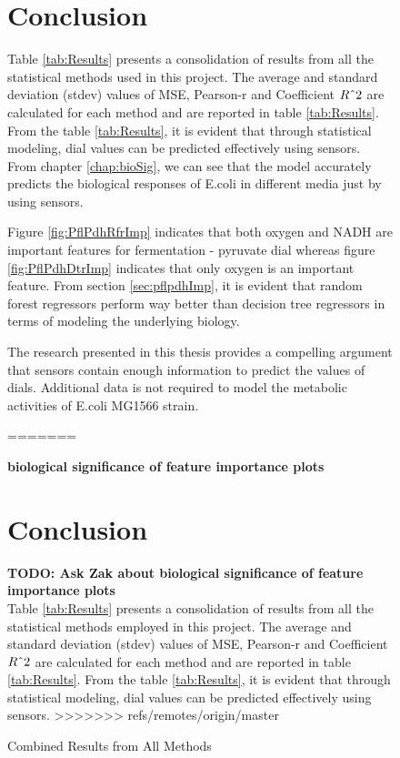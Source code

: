\documentclass[12pt,chapterheads]{ucsd}
\begin{document}
\begin{figure}[h!]
\chapter{Conclusion}
Table \ref{tab:Results} presents a consolidation of results from all the statistical methods used in this project. The average and standard deviation (stdev) values of MSE, Pearson-r and Coefficient $R\string^2$ are calculated for each method and are reported in table \ref{tab:Results}. From the table \ref{tab:Results}, it is evident that through statistical modeling, dial values can be predicted effectively using sensors. From chapter \ref{chap:bioSig}, we can see that the model accurately predicts the biological responses of E.coli in different media just by using sensors. 

Figure \ref{fig:PflPdhRfrImp} indicates that both oxygen and NADH are important features for fermentation - pyruvate dial whereas figure \ref{fig:PflPdhDtrImp} indicates that only oxygen is an important feature. From section \ref{sec:pflpdhImp}, it is evident that random forest regressors perform way better than decision tree regressors in terms of modeling the underlying biology. 

The research presented in this thesis provides a compelling argument that sensors contain enough information to predict the values of dials. Additional data is not required to model the metabolic activities of E.coli MG1566 strain.

=======

\textbf{biological significance of feature importance plots}
\chapter{Conclusion}
\textbf{TODO: Ask Zak about biological significance of feature importance plots}\\
Table \ref{tab:Results} presents a consolidation of results from all the statistical methods employed in this project. The average and standard deviation (stdev) values of MSE, Pearson-r and Coefficient $R\string^2$ are calculated for each method and are reported in table \ref{tab:Results}. From the table \ref{tab:Results}, it is evident that through statistical modeling, dial values can be predicted effectively using sensors. 
>>>>>>> refs/remotes/origin/master
\vspace{0.25in}
\begin{table}[!ht]
\caption[Combined Results from All Methods]{Combined Results from All Methods}


\end{table}
\end{figure}
\end{document}
